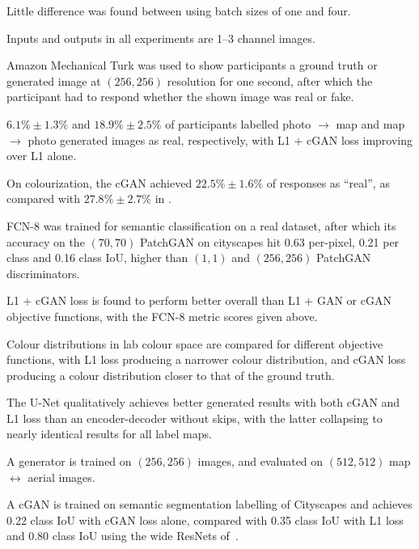 \documentclass[a4paper, 12pt]{article}
\begin{document}
Little difference was found between using batch sizes of one and four.

Inputs and outputs in all experiments are 1--3 channel images.

Amazon Mechanical Turk was used to show participants a ground truth or
generated image at $(256, 256)$ resolution for one second, after which the
participant had to respond whether the shown image was real or fake.

$6.1\% \pm 1.3\%$ and $18.9\% \pm 2.5\%$ of participants labelled photo
$\rightarrow$ map and map $\rightarrow$ photo generated images as real,
respectively, with L1 + cGAN loss improving over L1 alone.

On colourization, the cGAN achieved $22.5\% \pm 1.6\%$ of responses as
``real'', as compared with $27.8\% \pm 2.7\%$ in
\citet{DBLP:journals/corr/ZhangIE16}.

FCN-8 was trained for semantic classification on a real dataset, after which
its accuracy on the $(70, 70)$ PatchGAN on cityscapes hit 0.63 per-pixel, 0.21 per
class and 0.16 class IoU, higher than $(1, 1)$ and $(256, 256)$ PatchGAN
discriminators.


L1 + cGAN loss is found to perform better overall than L1 + GAN or cGAN
objective functions, with the FCN-8 metric scores given above.

Colour distributions in lab colour space are compared for different objective
functions, with L1 loss producing a narrower colour distribution, and cGAN loss
producing a colour distribution closer to that of the ground truth.

The U-Net qualitatively achieves better generated results with both cGAN and L1
loss than an encoder-decoder without skips, with the latter collapsing to
nearly identical results for all label maps.

A generator is trained on $(256, 256)$ images, and evaluated on $(512, 512)$
map $\leftrightarrow$ aerial images.

A cGAN is trained on semantic segmentation labelling of
Cityscapes\citet{DBLP:journals/corr/CordtsORREBFRS16} and achieves 0.22 class
IoU with cGAN loss alone, compared with 0.35 class IoU with L1 loss and 0.80
class IoU using the wide ResNets of~\citet{DBLP:journals/corr/WuSH16e}.
\end{document}
